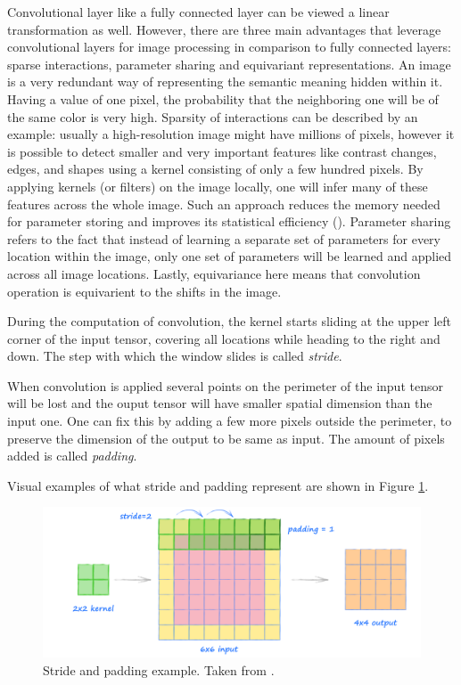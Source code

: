 Convolutional layer like a fully connected layer can be viewed a linear transformation as well. However, there are three main advantages that leverage convolutional layers for image processing in comparison to fully connected layers: sparse interactions, parameter sharing and equivariant representations. An image is a very redundant way of representing the semantic meaning hidden within it. Having a value of one pixel, the probability that the neighboring one will be of the same color is very high. Sparsity of interactions can be described by an example: usually a high-resolution image might have millions of pixels, however it is possible to detect smaller and very important features like contrast changes, edges, and shapes using a kernel consisting of only a few hundred pixels. By applying kernels (or filters) on the image locally, one will infer many of these features across the whole image. Such an approach reduces the memory needed for parameter storing and improves its statistical eﬃciency (\cite{Goodfellow_2016}). Parameter sharing refers to the fact that instead of learning a separate set of parameters for every location within the image, only one set of parameters will be learned and applied across all image locations. Lastly, equivariance here means that convolution operation is equivarient to the shifts in the image.

\begin{definition}[Stride]
	During the computation of convolution, the kernel starts sliding at the upper left corner of the input tensor, covering all locations while heading to the right and down. The step with which the window slides is called \textit{stride}. 
\end{definition}

\begin{definition}[Padding]
	When convolution is applied several points on the perimeter of the input tensor will be lost and the ouput tensor will have smaller spatial dimension than the input one. One can fix this by adding a few more pixels outside the perimeter, to preserve the dimension of the output to be same as input. The amount of pixels added is called \textit{padding}. 
\end{definition}

Visual examples of what stride and padding represent are shown in Figure \ref{fig:stride}.
\begin{figure}[htb]
	\begin{center}
		\includegraphics[width=0.6\linewidth]{bilder/stride_padding.png}
		\caption[Stride and padding example]%
		{Stride and padding example. Taken from \cite{stride}.}
		\label{fig:stride}
	\end{center}
\end{figure}

